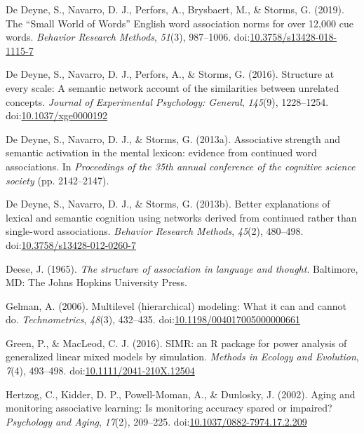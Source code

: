 \documentclass[english,,man]{apa6}
\begin{document}
\leavevmode\hypertarget{ref-DeDeyne2018}{}%
De Deyne, S., Navarro, D. J., Perfors, A., Brysbaert, M., \& Storms, G. (2019). The ``Small World of Words'' English word association norms for over 12,000 cue words. \emph{Behavior Research Methods}, \emph{51}(3), 987--1006. doi:\href{https://doi.org/10.3758/s13428-018-1115-7}{10.3758/s13428-018-1115-7}

\leavevmode\hypertarget{ref-DeDeyne2016}{}%
De Deyne, S., Navarro, D. J., Perfors, A., \& Storms, G. (2016). Structure at every scale: A semantic network account of the similarities between unrelated concepts. \emph{Journal of Experimental Psychology: General}, \emph{145}(9), 1228--1254. doi:\href{https://doi.org/10.1037/xge0000192}{10.1037/xge0000192}

\leavevmode\hypertarget{ref-DeDeyne2013a}{}%
De Deyne, S., Navarro, D. J., \& Storms, G. (2013a). Associative strength and semantic activation in the mental lexicon: evidence from continued word associations. In \emph{Proceedings of the 35th annual conference of the cognitive science society} (pp. 2142--2147).

\leavevmode\hypertarget{ref-DeDeyne2013}{}%
De Deyne, S., Navarro, D. J., \& Storms, G. (2013b). Better explanations of lexical and semantic cognition using networks derived from continued rather than single-word associations. \emph{Behavior Research Methods}, \emph{45}(2), 480--498. doi:\href{https://doi.org/10.3758/s13428-012-0260-7}{10.3758/s13428-012-0260-7}

\leavevmode\hypertarget{ref-Deese1965}{}%
Deese, J. (1965). \emph{The structure of association in language and thought}. Baltimore, MD: The Johns Hopkins University Press.

\leavevmode\hypertarget{ref-Gelman2006}{}%
Gelman, A. (2006). Multilevel (hierarchical) modeling: What it can and cannot do. \emph{Technometrics}, \emph{48}(3), 432--435. doi:\href{https://doi.org/10.1198/004017005000000661}{10.1198/004017005000000661}

\leavevmode\hypertarget{ref-Green2016}{}%
Green, P., \& MacLeod, C. J. (2016). SIMR: an R package for power analysis of generalized linear mixed models by simulation. \emph{Methods in Ecology and Evolution}, \emph{7}(4), 493--498. doi:\href{https://doi.org/10.1111/2041-210X.12504}{10.1111/2041-210X.12504}

\leavevmode\hypertarget{ref-Hertzog2002}{}%
Hertzog, C., Kidder, D. P., Powell-Moman, A., \& Dunlosky, J. (2002). Aging and monitoring associative learning: Is monitoring accuracy spared or impaired? \emph{Psychology and Aging}, \emph{17}(2), 209--225. doi:\href{https://doi.org/10.1037/0882-7974.17.2.209}{10.1037/0882-7974.17.2.209}
\end{document}
